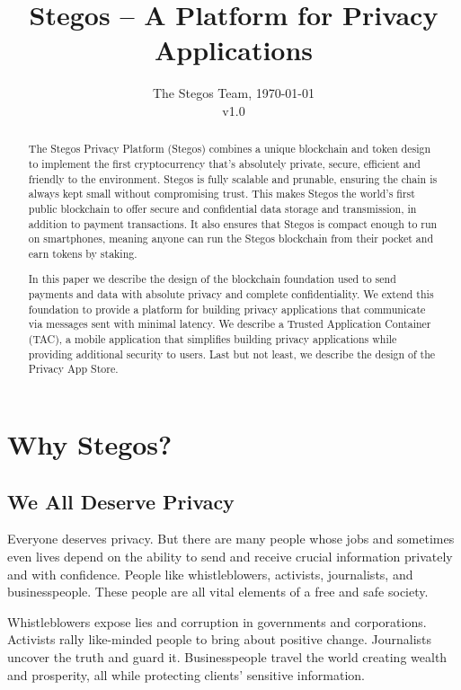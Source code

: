 \documentclass[a4paper, 10pt, conference]{ieeeconf}
\title{\LARGE \bf Stegos -- A Platform for Privacy Applications}
\author{The Stegos Team, \today \\v1.0}
\begin{document}
\maketitle
\thispagestyle{empty}
\pagestyle{plain}


\begin{abstract}
	The Stegos Privacy Platform (Stegos) combines a unique blockchain and token design to implement the first cryptocurrency that’s absolutely private, secure, efficient and friendly to the environment. Stegos is fully scalable and prunable, ensuring the chain is always kept small without compromising trust. This makes Stegos the world’s first public blockchain to offer secure and confidential data storage and transmission, in addition to payment transactions. It also ensures that Stegos is compact enough to run on smartphones, meaning anyone can run the Stegos blockchain from their pocket and earn tokens by staking.
	
    In this paper we describe the design of the blockchain foundation used to send payments and data with absolute privacy and complete confidentiality. We extend this foundation to provide a platform for building privacy applications that communicate via messages sent with minimal latency. We describe a Trusted Application Container (TAC), a mobile application that simplifies building privacy applications while providing additional security to users. Last but not least, we describe the design of the Privacy App Store. 
\end{abstract}

\section{Why Stegos?}

\subsection{We All Deserve Privacy}
Everyone deserves privacy. But there are many people whose jobs and sometimes even lives depend on the ability to send and receive crucial information privately and with confidence. People like whistleblowers, activists, journalists, and businesspeople. These people are all vital elements of a free and safe society. 

Whistleblowers expose lies and corruption in governments and corporations. Activists rally like-minded people to bring about positive change. Journalists uncover the truth and guard it. Businesspeople travel the world creating wealth and prosperity, all while protecting clients’ sensitive information.
\end{document}
